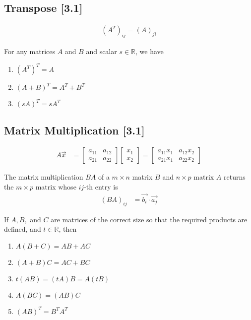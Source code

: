 \documentclass[a4paper,9pt]{extarticle}
\begin{document}
\begin{multicols*}{2}
\subsection{Transpose [3.1]}
\begin{equation} \label{3.1-3}
    \begin{split}
        (A^T)_{ij} = (A)_{ji}
    \end{split}
\end{equation}

For any matrices $A$ and $B$ and scalar $s \in \mathbb{R}$, we have
\begin{enumerate}[label=\bfseries (\arabic*)] \itemsep0pt \parskip0pt 
    \item $(A^T)^T = A$
    \item $(A + B)^T = A^T + B^T$
    \item $(s A)^T = s A^T$
\end{enumerate}


\subsection{Matrix Multiplication [3.1]}
\begin{equation} \label{3.1-4}
    \begin{split}
        A \vec{x} & = \begin{bmatrix}a_{11} & a_{12} \\ a_{21} & a_{22}\end{bmatrix} \begin{bmatrix}x_1 \\ x_2\end{bmatrix} = \begin{bmatrix}a_{11} x_1 & a_{12} x_2 \\ a_{21} x_1 & a_{22} x_2\end{bmatrix}
    \end{split}
\end{equation}

The matrix multiplication $BA$ of a $m \times n$ matrix $B$ and $n \times p$ matrix $A$ returns the $m \times p$ matrix whose $ij$-th entry is
\begin{equation} \label{3.1-5}
    \begin{split}
        (BA)_{ij} & = \vec{b_i} \cdot \vec{a_j}
    \end{split}
\end{equation}

If $A, B,$ and $C$ are matrices of the correct size so that the required products are defined, and $t \in \mathbb{R}$, then
\begin{enumerate}[label=\bfseries (\arabic*)] \itemsep0pt \parskip0pt 
    \item $A(B + C) = AB + AC$
    \item $(A + B)C = AC + BC$
    \item $t(AB) = (tA)B = A(tB)$
    \item $A(BC) = (AB)C$
    \item $(AB)^T = B^TA^T$
\end{enumerate}


\end{multicols*}
\end{document}
